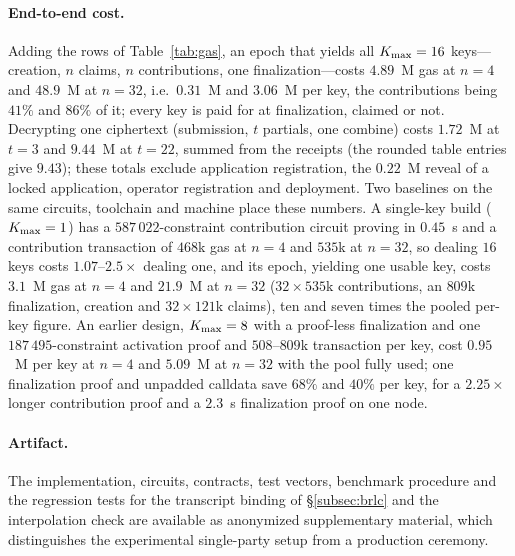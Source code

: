 \paragraph{End-to-end cost.} Adding the rows of Table~\ref{tab:gas}, an epoch that yields all $K_{\max} = 16$ keys---creation, $n$ claims, $n$ contributions, one finalization---costs $4.89$~M gas at $n = 4$ and $48.9$~M at $n = 32$, i.e.\ $0.31$~M and $3.06$~M per key, the contributions being $41\%$ and $86\%$ of it; every key is paid for at finalization, claimed or not. Decrypting one ciphertext (submission, $t$ partials, one combine) costs $1.72$~M at $t = 3$ and $9.44$~M at $t = 22$, summed from the receipts (the rounded table entries give $9.43$); these totals exclude application registration, the $0.22$~M reveal of a locked application, operator registration and deployment. Two baselines on the same circuits, toolchain and machine place these numbers. A single-key build ($K_{\max} = 1$) has a $587\,022$-constraint contribution circuit proving in $0.45$~s and a contribution transaction of $468$k gas at $n = 4$ and $535$k at $n = 32$, so dealing $16$ keys costs $1.07$--$2.5\times$ dealing one, and its epoch, yielding one usable key, costs $3.1$~M gas at $n = 4$ and $21.9$~M at $n = 32$ ($32 \times 535$k contributions, an $809$k finalization, creation and $32 \times 121$k claims), ten and seven times the pooled per-key figure. An earlier design, $K_{\max} = 8$ with a proof-less finalization and one $187\,495$-constraint activation proof and $508$--$809$k transaction per key, cost $0.95$~M per key at $n = 4$ and $5.09$~M at $n = 32$ with the pool fully used; one finalization proof and unpadded calldata save $68\%$ and $40\%$ per key, for a $2.25\times$ longer contribution proof and a $2.3$~s finalization proof on one node.

\paragraph{Artifact.} The implementation, circuits, contracts, test vectors, benchmark procedure and the regression tests for the transcript binding of \S\ref{subsec:brlc} and the interpolation check are available as anonymized supplementary material, which distinguishes the experimental single-party setup from a production ceremony.

